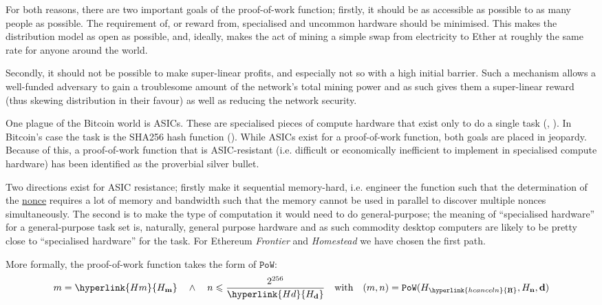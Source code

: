 \documentclass[9pt,oneside]{amsart}
\newcommand{\hcancel}[1]{%
    \tikz[baseline=(tocancel.base)]{
        \node[inner sep=0pt,outer sep=0pt] (tocancel) {#1};
        \draw[black] (tocancel.south west) -- (tocancel.north east);
    }%
}%
\begin{document}
\begin{multicols}{2}
For both reasons, there are two important goals of the proof-of-work function; firstly, it should be as accessible as possible to as many people as possible. The requirement of, or reward from, specialised and uncommon hardware should be minimised. This makes the distribution model as open as possible, and, ideally, makes the act of mining a simple swap from electricity to Ether at roughly the same rate for anyone around the world.

Secondly, it should not be possible to make super-linear profits, and especially not so with a high initial barrier. Such a mechanism allows a well-funded adversary to gain a troublesome amount of the network's total mining power and as such gives them a super-linear reward (thus skewing distribution in their favour) as well as reducing the network security.

One plague of the Bitcoin world is ASICs. These are specialised pieces of compute hardware that exist only to do a single task (\cite{ASICSmithMJS}, \cite{ASICWiki}). In Bitcoin's case the task is the SHA256 hash function (\cite{ASICbitcoinwiki}). While ASICs exist for a proof-of-work function, both goals are placed in jeopardy. Because of this, a proof-of-work function that is ASIC-resistant (i.e. difficult or economically inefficient to implement in specialised compute hardware) has been identified as the proverbial silver bullet.

Two directions exist for ASIC resistance; firstly make it sequential memory-hard, i.e. engineer the function such that the determination of the \hyperlink{block nonce}{nonce} requires a lot of memory and bandwidth such that the memory cannot be used in parallel to discover multiple nonces simultaneously. The second is to make the type of computation it would need to do general-purpose; the meaning of ``specialised hardware''  for a general-purpose task set is, naturally, general purpose hardware and as such commodity desktop computers are likely to be pretty close to ``specialised hardware'' for the task. For Ethereum \textit{Frontier} and \textit{Homestead} we have chosen the first path.

More formally, the proof-of-work function takes the form of $\mathtt{PoW}$:
\begin{equation}
m = \hyperlink{H m}{H_\mathbf{m}} \quad \wedge \quad n \leqslant \frac{2^{256}}{\hyperlink{H d}{H_\mathbf{d}}} \quad \text{with} \quad (m, n) = \mathtt{PoW}(H_{\hyperlink{h cancel n}{\hcancel{n}}}, H_\mathbf{n}, \mathbf{d})
\end{equation}


\end{multicols}
\end{document}
